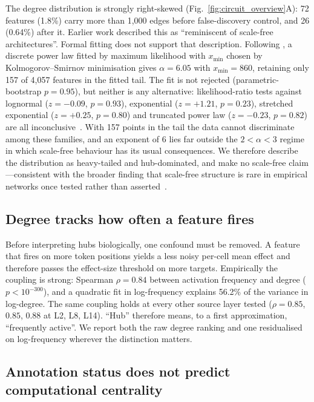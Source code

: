 \documentclass[11pt,onecolumn]{article}
\begin{document}
The degree distribution is strongly right-skewed (Fig.~\ref{fig:circuit_overview}A): 72 features (1.8\%) carry more than 1{,}000 edges before false-discovery control, and 26 (0.64\%) after it. Earlier work described this as ``reminiscent of scale-free architectures''. Formal fitting does not support that description. Following \citet{clauset2009powerlaw}, a discrete power law fitted by maximum likelihood with $x_\mathrm{min}$ chosen by Kolmogorov--Smirnov minimisation gives $\alpha=6.05$ with $x_\mathrm{min}=860$, retaining only 157 of 4{,}057 features in the fitted tail. The fit is not rejected (parametric-bootstrap $p=0.95$), but neither is any alternative: likelihood-ratio tests against lognormal ($z=-0.09$, $p=0.93$), exponential ($z=+1.21$, $p=0.23$), stretched exponential ($z=+0.25$, $p=0.80$) and truncated power law ($z=-0.23$, $p=0.82$) are all inconclusive~\citep{vuong1989likelihood}. With 157 points in the tail the data cannot discriminate among these families, and an exponent of 6 lies far outside the $2<\alpha<3$ regime in which scale-free behaviour has its usual consequences. We therefore describe the distribution as heavy-tailed and hub-dominated, and make no scale-free claim---consistent with the broader finding that scale-free structure is rare in empirical networks once tested rather than asserted~\citep{broido2019scalefree}.

\subsection{Degree tracks how often a feature fires}

Before interpreting hubs biologically, one confound must be removed. A feature that fires on more token positions yields a less noisy per-cell mean effect and therefore passes the effect-size threshold on more targets. Empirically the coupling is strong: Spearman $\rho=0.84$ between activation frequency and degree ($p<10^{-300}$), and a quadratic fit in log-frequency explains 56.2\% of the variance in log-degree. The same coupling holds at every other source layer tested ($\rho=0.85$, $0.85$, $0.88$ at L2, L8, L14). ``Hub'' therefore means, to a first approximation, ``frequently active''. We report both the raw degree ranking and one residualised on log-frequency wherever the distinction matters.

\subsection{Annotation status does not predict computational centrality}
\end{document}
